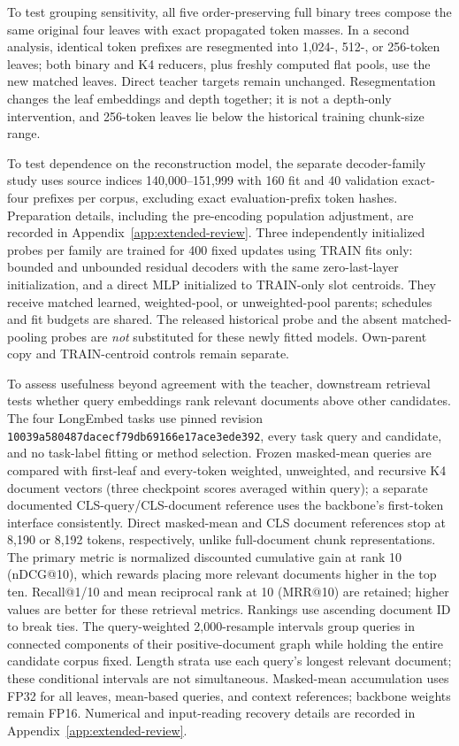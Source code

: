 \documentclass[10pt]{article}
\begin{document}
To test grouping sensitivity, all five order-preserving full binary trees
compose the same original four leaves with exact propagated token masses. In a
second analysis, identical token prefixes
are resegmented into 1,024-, 512-, or 256-token leaves; both binary and K4
reducers, plus freshly computed flat pools, use the new matched leaves. Direct
teacher targets remain unchanged. Resegmentation changes the leaf embeddings
and depth together; it is not a depth-only intervention, and 256-token leaves
lie below the historical training chunk-size range.

To test dependence on the reconstruction model, the separate decoder-family
study uses source indices 140,000--151,999 with
160 fit and 40 validation exact-four prefixes per corpus, excluding exact
evaluation-prefix token hashes. Preparation details, including the pre-encoding population adjustment, are
recorded in Appendix~\ref{app:extended-review}. Three independently
initialized probes per family are
trained for 400 fixed updates using TRAIN fits only: bounded and unbounded
residual decoders with the same zero-last-layer initialization, and a direct
MLP initialized to TRAIN-only slot centroids. They receive matched learned,
weighted-pool, or unweighted-pool parents; schedules and fit budgets are
shared. The released historical probe and the absent matched-pooling probes
are \emph{not} substituted for these newly fitted models. Own-parent copy
and TRAIN-centroid controls remain separate.

To assess usefulness beyond agreement with the teacher, downstream retrieval
tests whether query embeddings rank relevant documents above other candidates.
The four LongEmbed tasks \citep{zhu-etal-2024-longembed} use pinned revision
\nolinkurl{10039a580487dacecf79db69166e17ace3ede392}, every task query
and candidate, and no task-label fitting or method selection. Frozen
masked-mean queries are compared with first-leaf and every-token weighted,
unweighted, and recursive K4 document vectors (three checkpoint scores
averaged within query); a separate documented CLS-query/CLS-document
reference uses the backbone's first-token interface consistently. Direct
masked-mean and CLS document references stop at 8,190 or 8,192 tokens,
respectively, unlike full-document chunk representations. The primary metric
is normalized discounted cumulative gain at rank 10 (nDCG@10), which rewards
placing more relevant documents higher in the top ten. Recall@1/10 and mean
reciprocal rank at 10 (MRR@10) are retained; higher values are better for these
retrieval metrics. Rankings use ascending document ID to break ties. The
query-weighted 2,000-resample intervals group
queries in connected components of their positive-document graph while
holding the entire candidate corpus fixed. Length strata use each query's
longest relevant document; these conditional intervals are not simultaneous.
Masked-mean accumulation uses FP32 for all leaves, mean-based queries, and
context references; backbone weights remain FP16. Numerical and input-reading
recovery details are recorded in Appendix~\ref{app:extended-review}.
\end{document}
